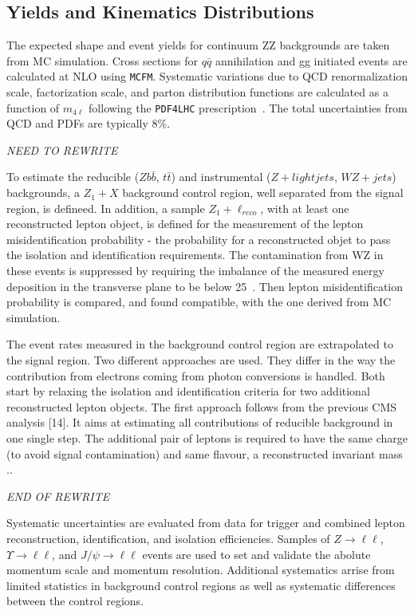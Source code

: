 \subsection{Yields and Kinematics Distributions}
\label{sec:HZZ4lyields}

The expected shape and event yields for continuum ZZ backgrounds
are taken from MC simulation.  Cross sections
for $q\bar{q}$ annihilation and gg initiated events are 
calculated at NLO using \verb+MCFM+.  Systematic variations due to 
QCD renormalization scale, factorization scale, and parton 
distribution functions are calculated as a function of $m_{4\ell}$
following the \verb+PDF4LHC+ prescription~\cite{Botje:2011sn,Alekhin:2011sk}. 
The total uncertainties from QCD and PDFs are typically 8\%.  

{\it NEED TO REWRITE}

To estimate the reducible ($Zb\bar{b}$, $t\bar{t}$) and 
instrumental ($Z+light jets$, $WZ+jets$) backgrounds, a 
$Z_1+X$ background control region, well separated from the 
signal region, is defineed.  In addition, a sample $Z_1+\ell_{reco}$,
with at least one reconstructed lepton object, is defined for the
measurement of the lepton misidentification probability - the
probability for a reconstructed objet to pass the isolation and 
identification requirements.  The contamination from WZ in these
events is suppressed by requiring the imbalance of the measured
energy deposition in the transverse plane to be below 25~\GeV. 
Then lepton misidentification probability is compared, and found
compatible, with the one derived from MC simulation.

The event rates measured in the background control region are
extrapolated to the signal region.  Two different approaches are
used.  They differ in the way the contribution from electrons
coming from photon conversions is handled.  Both start by 
relaxing the isolation and identification criteria for two 
additional reconstructed lepton objects.  The first approach 
follows from the previous CMS analysis [14].  It aims at
estimating all contributions of reducible background in one 
single step.  The additional pair of leptons is required to have
the same charge (to avoid signal contamination) and same flavour,
a reconstructed invariant mass .. 

{\it END OF REWRITE}

Systematic uncertainties are evaluated from data for trigger 
and combined lepton reconstruction, identification, and
isolation efficiencies.  Samples of $Z\to\ell\ell$, 
$\Upsilon\to\ell\ell$, and $J/\psi\to\ell\ell$ events are used
to set and validate the abolute momentum scale and momentum
resolution.  
Additional systematics arrise from limited statistics in 
background control regions as well as systematic differences 
between the control regions.  

